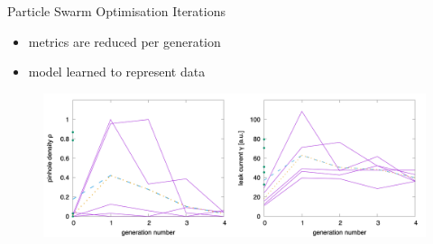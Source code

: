 \documentclass[hyperref={pdfpagelabels=false}, aspectratio=43, t]{beamer}  %
\begin{document}
\begin{frame}{Particle Swarm Optimisation Iterations}
	\begin{itemize}
		\item metrics are reduced per generation
		\item model learned to represent data
	\end{itemize}
	\begin{figure}
		\includegraphics[width=.96\textwidth]{figures/emma-gen.png}
	\end{figure}
\end{frame}
\end{document}
